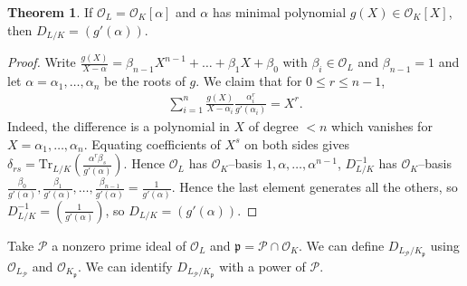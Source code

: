 \documentclass{article}
\theoremstyle{definition}
\newtheorem{theorem}{Theorem}[section]
\begin{document}
\begin{theorem}\label{theorem12.6}
    If $\mathcal{O}_{L} = \mathcal{O}_K[\alpha]$ and $\alpha$ has minimal polynomial $g(X) \in \mathcal{O}_K[X]$, then $D_{L/K} = (g'(\alpha))$.
\end{theorem}
\begin{proof}
    Write $\frac{g(X)}{X-\alpha}=\beta_{n-1}X^{n-1}+ \ldots + \beta_1 X + \beta_0$ with $\beta_i \in \mathcal{O}_L$ and $\beta_{n-1} = 1$ and let $\alpha=\alpha_1,\ldots,\alpha_n$ be the roots of $g$. We claim that for $0\le r\le n-1$, 
    \begin{align*}
        \sum_{i=1}^{n} \frac{g(X)}{X-\alpha_i}\frac{\alpha_i^r}{g'(\alpha_i)} = X^r.
    \end{align*}
    Indeed, the difference is a polynomial in $X$ of degree $<n$ which vanishes for $X=\alpha_1,\ldots,\alpha_n$. Equating coefficients of $X^s$ on both sides gives $\delta_{rs} = \text{Tr}_{L/K}\left(\frac{\alpha^r \beta_s}{g'(\alpha)}\right)$. Hence $\mathcal{O}_L$ has $\mathcal{O}_K$--basis $1,\alpha,\ldots,\alpha^{n-1}$, $D^{-1}_{L/K}$ has $\mathcal{O}_K$--basis $\frac{\beta_0}{g'(\alpha)}, \frac{\beta_1}{g'(\alpha)}, \ldots, \frac{\beta_{n-1}}{g'(\alpha)}=\frac{1}{g'(\alpha)}$. Hence the last element generates all the others, so $D_{L/K}^{-1} = \left(\frac{1}{g'(\alpha)}\right)$, so $D_{L/K} = (g'(\alpha))$.
\end{proof}

Take $\mathcal{P}$ a nonzero prime ideal of $\mathcal{O}_L$ and $\mathfrak{p} = \mathcal{P} \cap \mathcal{O}_K$. We can define $D_{L_\mathcal{P}/K_\mathfrak{p}}$ using $\mathcal{O}_{L_\mathcal{P}}$ and $\mathcal{O}_{K_{\mathfrak{p}}}$. We can identify $D_{L_\mathcal{P}/K_\mathfrak{p}}$ with a power of $\mathcal{P}$. 
\end{document}
